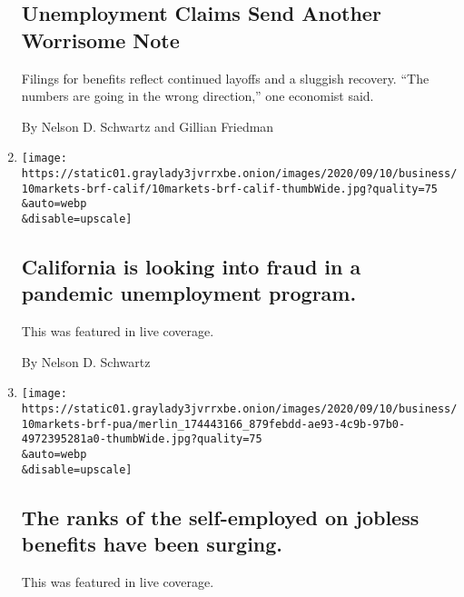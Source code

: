 \begin{enumerate}
  \hypertarget{unemployment-claims-send-another-worrisome-note}{%
  \subsection{Unemployment Claims Send Another Worrisome
  Note}\label{unemployment-claims-send-another-worrisome-note}}

  Filings for benefits reflect continued layoffs and a sluggish
  recovery. ``The numbers are going in the wrong direction,'' one
  economist said.

  By Nelson D. Schwartz and Gillian Friedman
\item
  \href{/live/2020/09/10/business/stock-market-today-coronavirus/california-is-looking-into-fraud-in-a-pandemic-unemployment-program}{}

  \texttt{[image: https://static01.graylady3jvrrxbe.onion/images/2020/09/10/business/10markets-brf-calif/10markets-brf-calif-thumbWide.jpg?quality=75\\\&auto=webp\\\&disable=upscale]}

  \hypertarget{california-is-looking-into-fraud-in-a-pandemic-unemployment-program}{%
  \subsection{California is looking into fraud in a pandemic
  unemployment
  program.}\label{california-is-looking-into-fraud-in-a-pandemic-unemployment-program}}

  This was featured in live coverage.

  By Nelson D. Schwartz
\item
  \href{/live/2020/09/10/business/stock-market-today-coronavirus/the-ranks-of-the-self-employed-on-jobless-benefits-have-been-surging}{}

  \texttt{[image: https://static01.graylady3jvrrxbe.onion/images/2020/09/10/business/10markets-brf-pua/merlin\_174443166\_879febdd-ae93-4c9b-97b0-4972395281a0-thumbWide.jpg?quality=75\\\&auto=webp\\\&disable=upscale]}

  \hypertarget{the-ranks-of-the-self-employed-on-jobless-benefits-have-been-surging}{%
  \subsection{The ranks of the self-employed on jobless benefits have
  been
  surging.}\label{the-ranks-of-the-self-employed-on-jobless-benefits-have-been-surging}}

  This was featured in live coverage.


\end{enumerate}
